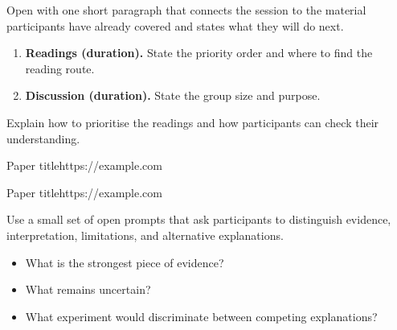 \documentclass[11pt]{article}
\begin{document}
\makeiliadreadingtitle

Open with one short paragraph that connects the session to the material
participants have already covered and states what they will do next.

\begin{sessionplan}
  \begin{enumerate}[nosep]
    \item \textbf{Readings (duration).} State the priority order and where to
      find the reading route.
    \item \textbf{Discussion (duration).} State the group size and purpose.
  \end{enumerate}
\end{sessionplan}

Explain how to prioritise the readings and how participants can check their
understanding.

\begin{reading}[Main]{Paper title}{https://example.com}
  \begin{readingroute}
  \end{readingroute}

\end{reading}

\newpage
\begin{reading}[Extension]{Paper title}{https://example.com}
  \begin{readingroute}
  \end{readingroute}

\end{reading}

Use a small set of open prompts that ask participants to distinguish evidence,
interpretation, limitations, and alternative explanations.
\begin{itemize}
  \item What is the strongest piece of evidence?
  \item What remains uncertain?
  \item What experiment would discriminate between competing explanations?
\end{itemize}
\end{document}
